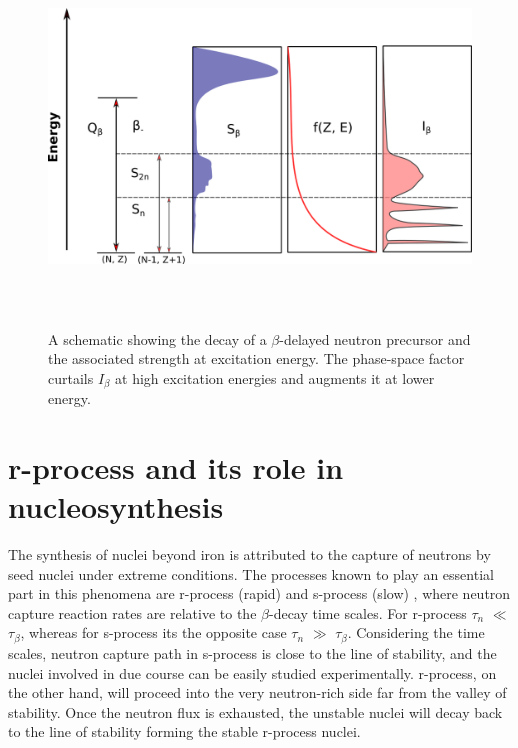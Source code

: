 \begin{figure}[h]
	\centering
	\includegraphics[width=16cm, height=10cm]{figures/strength_distribution.png}
	\caption[]{A schematic showing the decay of a $\beta$-delayed neutron precursor and the associated strength at excitation energy. The phase-space factor curtails $I_{\beta}$ at high excitation energies and augments it at lower energy.   }
	\label{fig:strength_distribution}
\end{figure}



\section{\textbf{r-process} and its role in nucleosynthesis}
The synthesis of nuclei beyond iron is attributed to the capture of neutrons by seed nuclei under extreme conditions. The processes known to play an essential part in this phenomena are r-process (rapid) and s-process (slow) \citep{burbridge}, where neutron capture reaction rates are relative to the $\beta$-decay time scales. For r-process $\tau_{n}$ $\ll$ $\tau_{\beta}$, whereas for s-process its the opposite case $\tau_{n}$ $\gg$ $\tau_{\beta}$. Considering the time scales, neutron capture path in s-process is close to the line of stability, and the nuclei involved in due course can be easily studied experimentally. r-process, on the other hand, will proceed into the very neutron-rich side far from the valley of stability. Once the neutron flux is exhausted, the unstable nuclei will decay back to the line of stability forming the stable r-process nuclei. 

